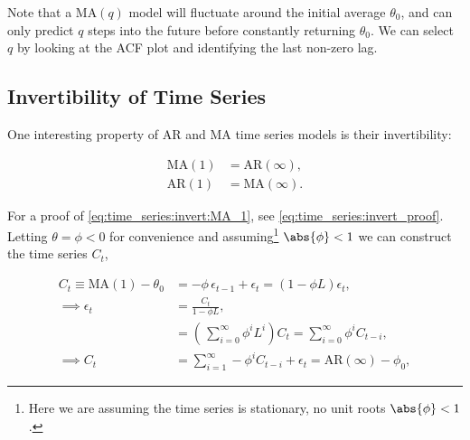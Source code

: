 Note that a $\text{MA}\left(q\right)$ model will fluctuate around the initial average $\theta_{0}$,
and can only predict $q$ steps into the future before constantly returning $\theta_{0}$.
We can select $q$ by looking at the ACF plot
and identifying the last non-zero lag.

\subsection{Invertibility of Time Series}
\label{additional:time_series:invert}

One interesting property of AR and MA time series models is their invertibility:

\begin{subequations}\label{eq:time_series:invert}
\begin{align}
\text{MA}\left(1\right) &= \text{AR}\left(\infty\right), \label{eq:time_series:invert:MA_1} \\
\text{AR}\left(1\right) &= \text{MA}\left(\infty\right). \label{eq:time_series:invert:AR_1}
\end{align}
\end{subequations}

For a proof of \cref{eq:time_series:invert:MA_1}, see \cref{eq:time_series:invert_proof}.
Letting $\theta = \phi < 0$ for convenience and
assuming\footnote{Here we are assuming the time series is stationary, \ie no unit roots $\abs{\phi} < 1$.} $\abs{\phi} < 1$
we can construct the time series $C_{t}$,

\begin{subequations}\label{eq:time_series:invert_proof}
\begin{align}
C_{t} \equiv \text{MA}\left(1\right) - \theta_{0} &= -\phi\, \epsilon_{t-1} + \epsilon_{t} = \left(1 - \phi L \right) \epsilon_{t}, \label{eq:time_series:invert_proof:a} \\
\implies \epsilon_{t} &= \frac{C_{t}}{1 - \phi L}, \label{eq:time_series:invert_proof:b} \\
&= \left(\,\sum_{i=0}^{\infty} \phi^{i} L^{i} \right) C_{t} = \sum_{i=0}^{\infty} \phi^{i} C_{t-i}, \label{eq:time_series:invert_proof:c} \\
\implies C_{t} &= \sum_{i=1}^{\infty} -\phi^{i} C_{t-i} + \epsilon_{t} = \text{AR}\left(\infty\right) - \phi_{0}, \label{eq:time_series:invert_proof:d}
\end{align}
\end{subequations}

